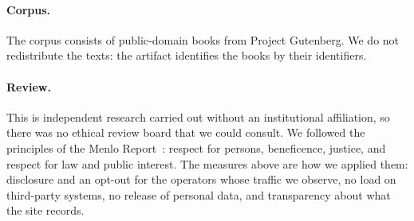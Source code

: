 \paragraph{Corpus.}
The corpus consists of public-domain books from Project Gutenberg.
We do not redistribute the texts: the artifact identifies the books by their identifiers.

\paragraph{Review.}
This is independent research carried out without an institutional affiliation, so there
was no ethical review board that we could consult.
We followed the principles of the Menlo Report~\cite{dittrich2012menlo}: respect for
persons, beneficence, justice, and respect for law and public interest.
The measures above are how we applied them: disclosure and an opt-out for the operators
whose traffic we observe, no load on third-party systems, no release of personal data, and
transparency about what the site records.
